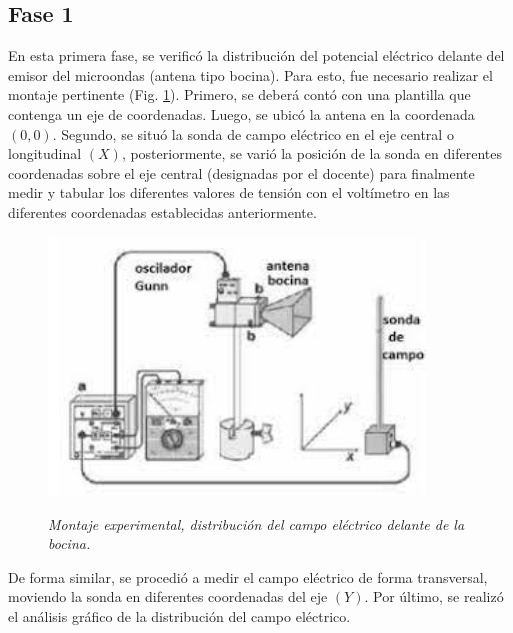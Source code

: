 \documentclass[spanish,notitlepage,letterpaper, 12pt]{article}
\begin{document}
\subsection{Fase 1}
En esta primera fase, se verificó la distribución del potencial eléctrico delante
del emisor del microondas (antena tipo bocina). Para esto, fue necesario realizar el
montaje pertinente (Fig. \ref{fig:montaje1}). Primero, se deberá contó con una plantilla que contenga un eje de
coordenadas. Luego, se ubicó la antena en la coordenada $(0,0)$. Segundo, se situó la sonda de campo eléctrico en el eje central o longitudinal $(X)$, posteriormente, se
varió la posición de la sonda en diferentes coordenadas sobre el eje central (designadas
por el docente) para finalmente medir y tabular los diferentes valores de tensión con el
voltímetro en las diferentes coordenadas establecidas anteriormente.\par
\begin{figure}[!ht]
    \centering
    \includegraphics[width=10.0cm]{images/montaje1.jpeg}
    \label{fig:montaje1}
    \caption{\textit{Montaje experimental, distribución del campo eléctrico delante de la bocina.}}
\end{figure}
De forma similar, se procedió a medir el campo eléctrico de forma transversal, moviendo
la sonda en diferentes coordenadas del eje $(Y)$. Por último, se realizó el análisis
gráfico de la distribución del campo eléctrico.
\end{document}
